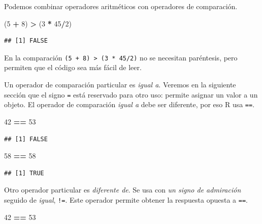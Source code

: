 \documentclass[
]{book}
\newenvironment{Shaded}{\begin{snugshade}}{\end{snugshade}}
\newcommand{\DecValTok}[1]{\textcolor[rgb]{0.00,0.00,0.81}{#1}}
\newcommand{\NormalTok}[1]{#1}
\newcommand{\OperatorTok}[1]{\textcolor[rgb]{0.81,0.36,0.00}{\textbf{#1}}}
\newcommand{\StringTok}[1]{\textcolor[rgb]{0.31,0.60,0.02}{#1}}
\begin{document}
Podemos combinar operadores aritméticos con operadores de comparación.

\begin{Shaded}
\begin{Highlighting}[]
\NormalTok{(}\DecValTok{5} \OperatorTok{+}\StringTok{ }\DecValTok{8}\NormalTok{) }\OperatorTok{>}\StringTok{ }\NormalTok{(}\DecValTok{3} \OperatorTok{*}\StringTok{ }\DecValTok{45}\OperatorTok{/}\DecValTok{2}\NormalTok{) }
\end{Highlighting}
\end{Shaded}

\begin{verbatim}
## [1] FALSE
\end{verbatim}

En la comparación \texttt{(5\ +\ 8)\ \textgreater{}\ (3\ *\ 45/2)} no se necesitan paréntesis, pero permiten que el código sea más fácil de leer.

Un operador de comparación particular es \emph{igual a}. Veremos en la siguiente sección que el signo \texttt{=} está reservado para otro uso: permite asignar un valor a un objeto. El operador de comparación \emph{igual a} debe ser diferente, por eso R usa \texttt{==}.

\begin{Shaded}
\begin{Highlighting}[]
\DecValTok{42} \OperatorTok{==}\StringTok{ }\DecValTok{53}
\end{Highlighting}
\end{Shaded}

\begin{verbatim}
## [1] FALSE
\end{verbatim}

\begin{Shaded}
\begin{Highlighting}[]
\DecValTok{58} \OperatorTok{==}\StringTok{ }\DecValTok{58}
\end{Highlighting}
\end{Shaded}

\begin{verbatim}
## [1] TRUE
\end{verbatim}

Otro operador particular es \emph{diferente de}. Se usa con \emph{un signo de admiración} seguido de \emph{igual}, \texttt{!=}. Este operador permite obtener la respuesta opuesta a \texttt{==}.

\begin{Shaded}
\begin{Highlighting}[]
\DecValTok{42} \OperatorTok{==}\StringTok{ }\DecValTok{53}
\end{Highlighting}
\end{Shaded}
\end{document}
